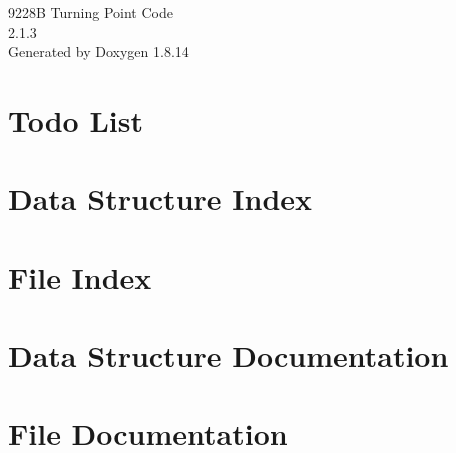 \documentclass[twoside]{article}
\newcommand{\+}{\discretionary{\mbox{\scriptsize$\hookleftarrow$}}{}{}}
\newcommand{\clearemptydoublepage}{%
  \newpage{\pagestyle{empty}\cleardoublepage}%
}
\begin{document}
\begin{titlepage}
\vspace*{7cm}
\begin{center}%
{\Large 9228B Turning Point Code \\[1ex]\large 2.\+1.\+3 }\\
\vspace*{1cm}
{\large Generated by Doxygen 1.8.14}\\
\end{center}
\end{titlepage}
\tableofcontents
{}

\section{Todo List}
\label{todo}

\section{Data Structure Index}

\section{File Index}

\section{Data Structure Documentation}

\section{File Documentation}

























\newpage
{}
\clearemptydoublepage
{}
\printindex
\end{document}
